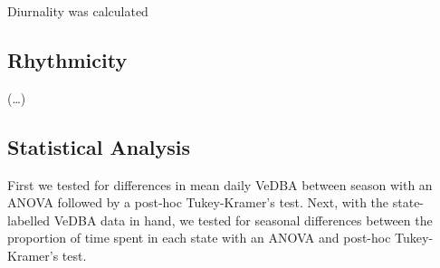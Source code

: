 \documentclass[english,msc,numbers,hidelinks]{coppe}
\begin{document}
  Diurnality was calculated

  \hypertarget{rhythmicity}{%
  \subsection{Rhythmicity}\label{rhythmicity}}

  (\ldots)

  \hypertarget{statistical-analysis}{%
  \subsection{Statistical Analysis}\label{statistical-analysis}}

  First we tested for differences in mean daily VeDBA between season with an ANOVA followed by a post-hoc Tukey-Kramer's test. Next, with the state-labelled VeDBA data in hand, we tested for seasonal differences between the proportion of time spent in each state with an ANOVA and post-hoc Tukey-Kramer's test.
\end{document}

